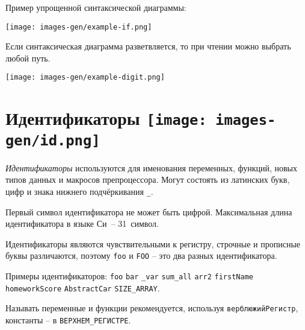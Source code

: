\documentclass[myc.tex]{subfiles}
\begin{document}
Пример упрощенной синтаксической диаграммы:

\begin{center}
\texttt{[image: images-gen/example-if.png]}
\end{center}

Если синтаксическая диаграмма разветвляется, то при чтении можно выбрать любой путь.

\begin{center}
\texttt{[image: images-gen/example-digit.png]}
\end{center}




















\section[Идентификаторы]{Идентификаторы \hfill\texttt{[image: images-gen/id.png]}}

\textit{Идентификаторы} используются для именования переменных, функций, новых типов данных и макросов препроцессора. Могут состоять из латинских букв, цифр и знака нижнего подчёркивания \texttt{\_}.

Первый символ идентификатора не может быть цифрой. Максимальная длина идентификатора в языке Си~-- 31~символ.

Идентификаторы являются чувствительными к регистру, строчные и прописные буквы различаются, поэтому \texttt{foo} и \texttt{FOO} -- это два разных идентификатора.

Примеры идентификаторов: \texttt{foo} \texttt{bar} \texttt{\_var} \texttt{sum\_all} \texttt{arr2} \texttt{firstName} \texttt{homeworkScore} \texttt{AbstractCar} \texttt{SIZE\_ARRAY}.

Называть переменные и функции рекомендуется, используя \texttt{верблюжийРегистр}, константы -- в \texttt{ВЕРХНЕМ\_РЕГИСТРЕ}.
\end{document}
